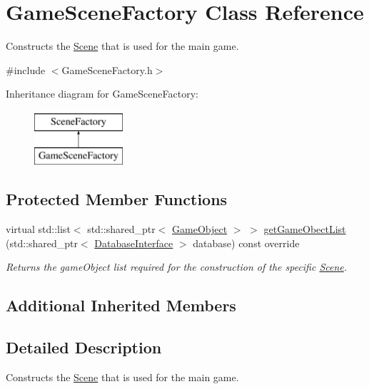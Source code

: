 \hypertarget{class_game_scene_factory}{}\section{Game\+Scene\+Factory Class Reference}
\label{class_game_scene_factory}


Constructs the \hyperlink{class_scene}{Scene} that is used for the main game.  




{\ttfamily \#include $<$Game\+Scene\+Factory.\+h$>$}

Inheritance diagram for Game\+Scene\+Factory\+:\begin{figure}[H]
\begin{center}
\leavevmode
\includegraphics[height=2.000000cm]{da/da3/class_game_scene_factory}
\end{center}
\end{figure}
\subsection*{Protected Member Functions}
\begin{DoxyCompactItemize}
\item 
virtual std\+::list$<$ std\+::shared\+\_\+ptr$<$ \hyperlink{class_game_object}{Game\+Object} $>$ $>$ \hyperlink{class_game_scene_factory_a2db801c1a1703a14a00c7b6e8bdca5b0}{get\+Game\+Obect\+List} (std\+::shared\+\_\+ptr$<$ \hyperlink{class_database_interface}{Database\+Interface} $>$ database) const override
\begin{DoxyCompactList}\small\item\em Returns the game\+Object list required for the construction of the specific \hyperlink{class_scene}{Scene}. \end{DoxyCompactList}\end{DoxyCompactItemize}
\subsection*{Additional Inherited Members}


\subsection{Detailed Description}
Constructs the \hyperlink{class_scene}{Scene} that is used for the main game. 


